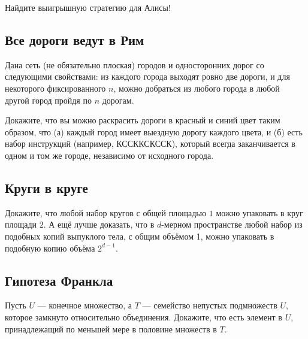 Найдите выигрышную стратегию для Алисы!

\subsection*{Все дороги ведут в Рим}

Дана сеть (не обязательно плоская) городов и односторонних дорог со следующими свойствами:
из каждого города выходят ровно две дороги, и для некоторого фиксированного $n$, можно добраться из любого города в любой другой город пройдя по $n$ дорогам.

Докажите, что вы можно раскрасить дороги в красный и синий цвет таким образом, что (а) каждый город имеет выездную дорогу каждого цвета, и (б) есть набор инструкций (например, КССККСКССК), который всегда заканчивается в одном и том же городе, независимо от исходного города.

\subsection*{Круги в круге}

Докажите, что любой набор кругов с общей площадью $1$ можно упаковать в круг площади $2$.
А ещё лучше доказать, что в $d$-мерном пространстве любой набор из подобных копий выпуклого тела, с общим объёмом 1, можно упаковать в подобную копию объёма $2^{d-1}$.

\subsection*{Гипотеза Франкла}

Пусть $U$ --- конечное множество, а $T$ --- семейство непустых подмножеств $U$, которое замкнуто относительно объединения.
Докажите, что есть элемент в $U$, принадлежащий по меньшей мере в половине множеств в $T$.
